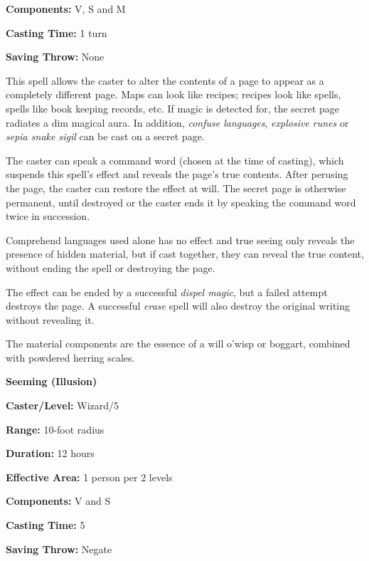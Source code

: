 \begin{multicols}{2}
\begin{minipage}{\columnwidth}
\noindent \textbf{Components:} V, S and M

\noindent \textbf{Casting Time:} 1 turn

\noindent \textbf{Saving Throw:} None

\end{minipage}

This spell allows the caster to alter the contents of a page to appear as a completely different page.  Maps can look like recipes; recipes look like spells, spells like book keeping records, etc.  If magic is detected for, the secret page radiates a dim magical aura.  In addition, \textit{confuse languages}, \textit{explosive runes} or \textit{sepia snake sigil} can be cast on a secret page.

The caster can speak a command word (chosen at the time of casting), which suspends this spell's effect and reveals the page's true contents.  After perusing the page, the caster can restore the effect at will.  The secret page is otherwise permanent, until destroyed or the caster ends it by speaking the command word twice in succession.

Comprehend languages used alone has no effect and true seeing only reveals the presence of hidden material, but if cast together, they can reveal the true content, without ending the spell or destroying the page.  

The effect can be ended by a successful \textit{dispel magic}, but a failed attempt destroys the page.  A successful \textit{erase} spell will also destroy the original writing without revealing it.

The material components are the essence of a will o'wisp or boggart, combined with powdered herring scales.

\vspace{1em}

\noindent
\begin{minipage}{\columnwidth}

\noindent \textbf{Seeming (Illusion)}

\noindent \textbf{Caster/Level:} Wizard/5

\noindent \textbf{Range:} 10-foot radius

\noindent \textbf{Duration:} 12 hours

\noindent \textbf{Effective Area:} 1 person per 2 levels

\noindent \textbf{Components:} V and S

\noindent \textbf{Casting Time:} 5

\noindent \textbf{Saving Throw:} Negate


\end{minipage}
\end{multicols}
